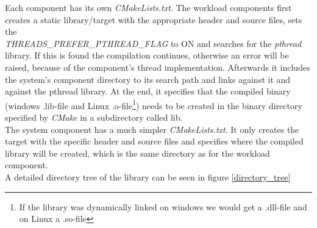 Each component has its own \textit{CMakeLists.txt}. The workload components first creates a static library/target with the appropriate header and source files, sets the \\ \textit{THREADS\_PREFER\_PTHREAD\_FLAG} to ON and searches for the \textit{pthread} library. If this is found the compilation continues, otherwise an error will be raised, because of the component's thread implementation. Afterwards it includes the system's component directory to its search path and links against it and against the pthread library. At the end, it specifies that the compiled binary (windows .lib-file and Linux .o-file\footnote{If the library was dynamically linked on windows we would get a .dll-file and on Linux a .so-file}) needs to be created in the binary directory specified by \textit{CMake} in a subdirectory called \dq lib\dq{}.\\
The system component has a much simpler \textit{CMakeLists.txt}. It only creates the target with the specific header and source files and specifies where the compiled library will be created, which is the same directory as for the workload component.\\
A detailed directory tree of the library can be seen in figure \ref{directory_tree}
